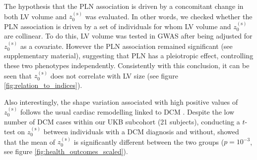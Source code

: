 The hypothesis that the PLN association is driven by a concomitant change in both LV volume and $z_0^{(\text{s})}$ was evaluated. In other words, we checked whether the PLN association is driven by a set of individuals for whom LV volume and $z_0^{(\text{s})}$ are collinear. To do this, LV volume was tested in GWAS after being adjusted for $z_0^{(\text{s})}$ as a covariate. However the PLN association remained significant (see supplementary material), suggesting that PLN has a pleiotropic effect, controlling these two phenotypes independently. Consistently with this conclusion, it can be seen that $z_0^{(\text{s})}$ does not correlate with LV size (see figure \ref{fig:relation_to_indices}).

Also interestingly, the shape variation associated with high positive values of $z_0^{(\text{s})}$ follows the usual cardiac remodelling linked to DCM \cite{ref_dcm}. Despite the low number of DCM cases within our UKB subcohort (21 subjects), conducting a $t$-test on $z_0^{(\text{s})}$ between individuals with a DCM diagnosis and without, showed that the mean of $z_0^{(\text{s})}$ is significantly different between the two groups ($p=10^{-3}$, see figure \ref{fig:health_outcomes_scaled}).

